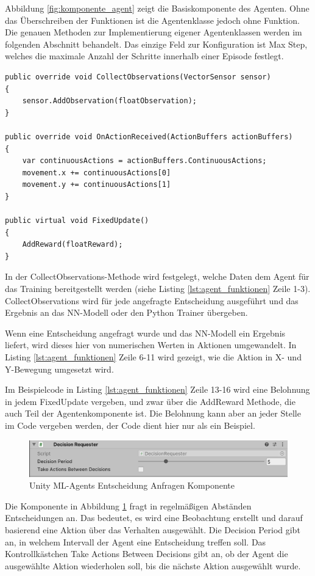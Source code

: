 Abbildung \ref{fig:komponente_agent} zeigt die Basiskomponente des Agenten. Ohne das Überschreiben der Funktionen ist die Agentenklasse jedoch ohne Funktion. Die genauen Methoden zur Implementierung eigener Agentenklassen werden im folgenden Abschnitt behandelt. Das einzige Feld zur Konfiguration ist \grqq{}Max Step\grqq{}, welches die maximale Anzahl der Schritte innerhalb einer Episode festlegt.

\begin{lstlisting}[caption={Agent Funktionen},captionpos=b,label={lst:agent_funktionen}]
public override void CollectObservations(VectorSensor sensor)
{
    sensor.AddObservation(floatObservation);
}

public override void OnActionReceived(ActionBuffers actionBuffers)
{
    var continuousActions = actionBuffers.ContinuousActions;
    movement.x += continuousActions[0]
    movement.y += continuousActions[1]
}

public virtual void FixedUpdate()
{
    AddReward(floatReward);
}
\end{lstlisting}

In der CollectObservations-Methode wird festgelegt, welche Daten dem Agent für das Training bereitgestellt werden (siehe Listing \ref{lst:agent_funktionen} Zeile 1-3). CollectObservations wird für jede angefragte Entscheidung ausgeführt und das Ergebnis an das NN-Modell oder den Python Trainer übergeben.

Wenn eine Entscheidung angefragt wurde und das NN-Modell ein Ergebnis liefert, wird dieses hier von numerischen Werten in Aktionen umgewandelt. In Listing \ref{lst:agent_funktionen} Zeile 6-11 wird gezeigt, wie die Aktion in X- und Y-Bewegung umgesetzt wird.

Im Beispielcode in Listing \ref{lst:agent_funktionen} Zeile 13-16 wird eine Belohnung in jedem FixedUpdate vergeben, und zwar über die AddReward Methode, die auch Teil der Agentenkomponente ist. Die Belohnung kann aber an jeder Stelle im Code vergeben werden, der Code dient hier nur als ein Beispiel.

\begin{figure}[H]
  \centering  
  \includegraphics[scale=0.5]{img/komponente_decision_requester}
  \caption{Unity ML-Agents Entscheidung Anfragen Komponente}
  \label{fig:komponente_decision_requester}
\end{figure}

Die Komponente in Abbildung \ref{fig:komponente_decision_requester} fragt in regelmäßigen Abständen Entscheidungen an. Das bedeutet, es wird eine Beobachtung erstellt und darauf basierend eine Aktion über das Verhalten ausgewählt. Die \grqq{}Decision Period\grqq{} gibt an, in welchem Intervall der Agent eine Entscheidung treffen soll. Das Kontrollkästchen \grqq{}Take Actions Between Decisions\grqq{} gibt an, ob der Agent die ausgewählte Aktion wiederholen soll, bis die nächste Aktion ausgewählt wurde.